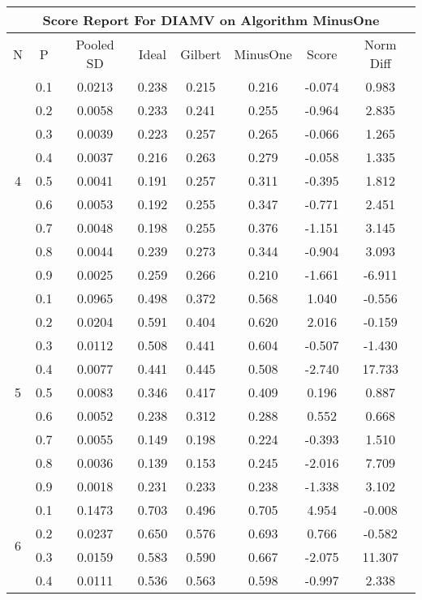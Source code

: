 \documentclass[11pt,a4paper]{report}
\begin{document}
\begin{longtable}{ | c | c || c | c | c | c | c | c | }
\hline
\multicolumn{8}{|c|}{ Score Report For DIAMV on Algorithm MinusOne} \\
\hline
N & P & Pooled SD &  Ideal &  Gilbert & MinusOne  & Score & Norm Diff \\
 \hline
 \hline
 \endhead
\multirow{9}{*}{4} & 0.1 & 0.0213 & 0.238 & 0.215 & 0.216 & -0.074 & 0.983 \\
 & 0.2 & 0.0058 & 0.233 & 0.241 & 0.255 & -0.964 & 2.835 \\
 & 0.3 & 0.0039 & 0.223 & 0.257 & 0.265 & -0.066 & 1.265 \\
 & 0.4 & 0.0037 & 0.216 & 0.263 & 0.279 & -0.058 & 1.335 \\
 & 0.5 & 0.0041 & 0.191 & 0.257 & 0.311 & -0.395 & 1.812 \\
 & 0.6 & 0.0053 & 0.192 & 0.255 & 0.347 & -0.771 & 2.451 \\
 & 0.7 & 0.0048 & 0.198 & 0.255 & 0.376 & -1.151 & 3.145 \\
 & 0.8 & 0.0044 & 0.239 & 0.273 & 0.344 & -0.904 & 3.093 \\
 & 0.9 & 0.0025 & 0.259 & 0.266 & 0.210 & -1.661 & -6.911 \\
 \hline
\multirow{9}{*}{5} & 0.1 & 0.0965 & 0.498 & 0.372 & 0.568 & 1.040 & -0.556 \\
 & 0.2 & 0.0204 & 0.591 & 0.404 & 0.620 & 2.016 & -0.159 \\
 & 0.3 & 0.0112 & 0.508 & 0.441 & 0.604 & -0.507 & -1.430 \\
 & 0.4 & 0.0077 & 0.441 & 0.445 & 0.508 & -2.740 & 17.733 \\
 & 0.5 & 0.0083 & 0.346 & 0.417 & 0.409 & 0.196 & 0.887 \\
 & 0.6 & 0.0052 & 0.238 & 0.312 & 0.288 & 0.552 & 0.668 \\
 & 0.7 & 0.0055 & 0.149 & 0.198 & 0.224 & -0.393 & 1.510 \\
 & 0.8 & 0.0036 & 0.139 & 0.153 & 0.245 & -2.016 & 7.709 \\
 & 0.9 & 0.0018 & 0.231 & 0.233 & 0.238 & -1.338 & 3.102 \\
 \hline
\multirow{9}{*}{6} & 0.1 & 0.1473 & 0.703 & 0.496 & 0.705 & 4.954 & -0.008 \\
 & 0.2 & 0.0237 & 0.650 & 0.576 & 0.693 & 0.766 & -0.582 \\
 & 0.3 & 0.0159 & 0.583 & 0.590 & 0.667 & -2.075 & 11.307 \\
 & 0.4 & 0.0111 & 0.536 & 0.563 & 0.598 & -0.997 & 2.338 \\

\end{longtable}
\end{document}
